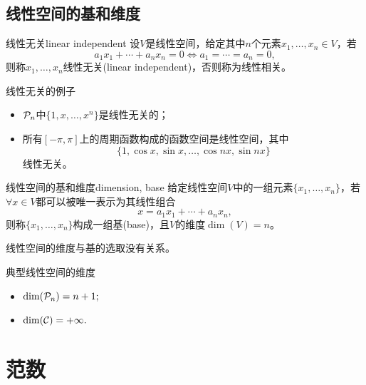 \subsection{线性空间的基和维度}

\begin{definition}
    {线性无关}{linear independent}
    设$V$是线性空间，给定其中$n$个元素$x_1,\ldots,x_n \in V$，若%
    \begin{equation}
        a_1x_1 + \cdots + a_nx_n = 0 \iff a_1 = \cdots = a_n = 0,
    \end{equation}
    则称$x_1,\ldots,x_n$线性无关(linear independent)，否则称为线性相关。
\end{definition}

\begin{example}
    {线性无关的例子}{}
    \begin{itemize}
        \item $\mathcal{P}_n$中$\{1,x,\ldots,x^n\}$是线性无关的；
        \item 所有$[-\pi,\pi]$上的周期函数构成的函数空间是线性空间，其中
        \[
            \{1,\cos x,\sin x,\ldots,\cos nx,\sin nx\} 
        \]
        线性无关。
    \end{itemize}
\end{example}

\begin{definition}
    {线性空间的基和维度}{dimension, base}
    给定线性空间$V$中的一组元素$\{x_1,\ldots,x_n\}$，若$\forall x \in V$都可以被唯一表示为其线性组合
    \begin{equation}
        x = a_1x_1 + \cdots + a_nx_n,
    \end{equation}
    则称$\{x_1,\ldots,x_n\}$构成一组基(base)，且$V$的维度$\dim(V) = n$。
\end{definition}

\begin{theorem}
    {}{}
    线性空间的维度与基的选取没有关系。
\end{theorem}

\begin{example}
    {典型线性空间的维度}{}
    \begin{itemize}
        \item $\dim(\mathcal{P}_n) = n + 1;$
        \item $\dim(\mathcal{C}) = +\infty.$
    \end{itemize}
\end{example}

\section{范数}
\label{sec:norm}

